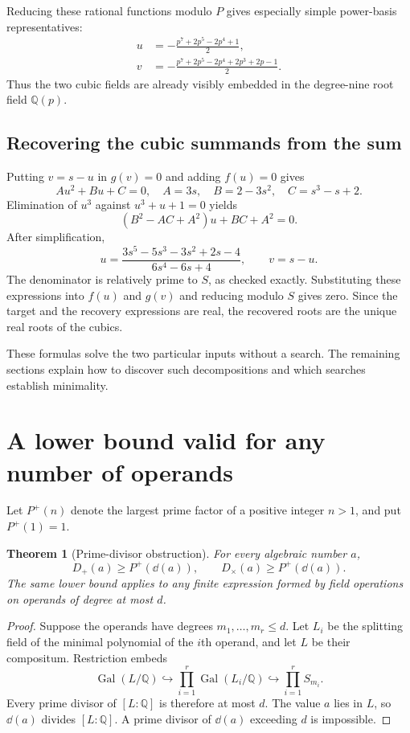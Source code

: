\documentclass[11pt,a4paper]{article}
\newtheorem{theorem}{Theorem}[section]
\theoremstyle{definition}\newtheorem{definition}[theorem]{Definition}
\theoremstyle{remark}\newtheorem{remark}[theorem]{Remark}
\newcommand{\Q}{\mathbb Q}\newcommand{\C}{\mathbb C}\newcommand{\Z}{\mathbb Z}
\newcommand{\Gal}{\operatorname{Gal}}\newcommand{\Tr}{\operatorname{Tr}}
\newcommand{\Dsum}{D_{+}}\newcommand{\Dprod}{D_{\times}}\newcommand{\Dtwo}{D_{\times,2}}
\begin{document}
Reducing these rational functions modulo $P$ gives especially simple power-basis representatives:
\begin{align}
 u&=-\frac{p^7+2p^5-2p^4+1}{2},\label{eq:upoly}\\
 v&=-\frac{p^7+2p^5-2p^4+2p^3+2p-1}{2}.\label{eq:vpoly}
\end{align}
Thus the two cubic fields are already visibly embedded in the degree-nine root field $\Q(p)$.

\subsection{Recovering the cubic summands from the sum}
Putting $v=s-u$ in $g(v)=0$ and adding $f(u)=0$ gives
\[
 Au^2+Bu+C=0,
 \quad A=3s,\quad B=2-3s^2,\quad C=s^3-s+2.
\]
Elimination of $u^3$ against $u^3+u+1=0$ yields
\[
 (B^2-AC+A^2)u+BC+A^2=0.
\]
After simplification,
\begin{equation}
 \boxed{\quad
 u=\frac{3s^5-5s^3-3s^2+2s-4}{6s^4-6s+4},
 \qquad v=s-u.\quad}
 \label{eq:sumrecovery}
\end{equation}
The denominator is relatively prime to $S$, as checked exactly. Substituting these expressions into $f(u)$ and $g(v)$ and reducing modulo $S$ gives zero. Since the target and the recovery expressions are real, the recovered roots are the unique real roots of the cubics.

These formulas solve the two particular inputs without a search. The remaining sections explain how to discover such decompositions and which searches establish minimality.

\section{A lower bound valid for any number of operands}
\label{sec:lower}
Let $P^+(n)$ denote the largest prime factor of a positive integer $n>1$, and put $P^+(1)=1$.

\begin{theorem}[Prime-divisor obstruction]
\label{thm:prime}
For every algebraic number $a$,
\[
 \Dsum(a)\ge P^+(\dd(a)),\qquad
 \Dprod(a)\ge P^+(\dd(a)).
\]
The same lower bound applies to any finite expression formed by field operations on operands of degree at most $d$.
\end{theorem}
\begin{proof}
Suppose the operands have degrees $m_1,\ldots,m_r\le d$. Let $L_i$ be the splitting field of the minimal polynomial of the $i$th operand, and let $L$ be their compositum. Restriction embeds
\[
 \Gal(L/\Q)\hookrightarrow\prod_{i=1}^r\Gal(L_i/\Q)
 \hookrightarrow\prod_{i=1}^r S_{m_i}.
\]
Every prime divisor of $[L:\Q]$ is therefore at most $d$. The value $a$ lies in $L$, so $\dd(a)$ divides $[L:\Q]$. A prime divisor of $\dd(a)$ exceeding $d$ is impossible.
\end{proof}
\end{document}
